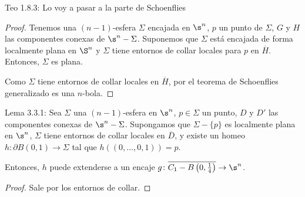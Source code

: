 \begin{teo}
Teo 1.8.3: Lo voy a pasar a la parte de Schoenflies
\end{teo}

\begin{proof}
Tenemos una $(n-1)$-esfera $\Sigma$ encajada en $\s^n$, $p$ un punto de $\Sigma$, $G$ y $H$ las componentes conexas de $\s^n - \Sigma$. Suponemos que $\Sigma$ está encajada de forma localmente plana en $\S^n$ y $\Sigma$ tiene entornos de collar locales para $p$ en $\overline{H}$. Entonces, $\Sigma$ es plana.

Como $\Sigma$ tiene entornos de collar locales en $\overline{H}$, por el teorema de Schoenflies generalizado es una $n$-bola.
\end{proof}

\begin{lema}
Lema 3.3.1: Sea $\Sigma$ una $(n-1)$-esfera en $\s^n$, $p\in\Sigma$ un punto, $D$ y $D'$ las componentes conexas de $\s^n - \Sigma$. Supongamos que $\Sigma-\{p\}$ es localmente plana en $\s^n$, $\Sigma$ tiene entornos de collar locales en $\overline{D}$, y existe un homeo $h\colon\partial B(0,1)\to\Sigma$ tal que $h\left((0,\dots,0,1)\right)=p$.

Entonces, $h$ puede extenderse a un encaje $g\colon\overline{C_1-B\left(0,\frac{1}{4}\right)}\to\s^n$.
\end{lema}

\begin{proof}
Sale por los entornos de collar.
\end{proof}